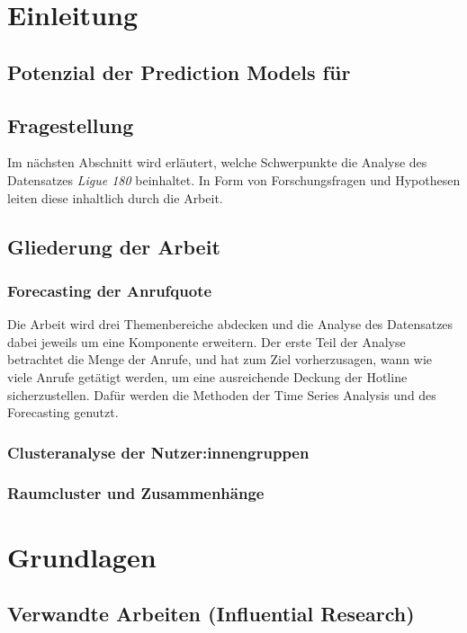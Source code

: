 \documentclass[12pt]{report}
\begin{document}
	\renewcommand{\headrulewidth}{0.1 pt}
	\renewcommand{\footrulewidth}{0 pt}
	
	\chapter{Einleitung}
	
	\section{Potenzial der Prediction Models für} %
	\section{Fragestellung}
	Im nächsten Abschnitt wird erläutert, welche Schwerpunkte die Analyse des Datensatzes \textit{Ligue 180} beinhaltet. In Form von Forschungsfragen und Hypothesen leiten diese inhaltlich durch die Arbeit. 
	\section{Gliederung der Arbeit}
	\subsection{Forecasting der Anrufquote}
	Die Arbeit wird drei Themenbereiche abdecken und die Analyse des Datensatzes dabei jeweils um eine Komponente erweitern. Der erste Teil der Analyse betrachtet die Menge der Anrufe, und hat zum Ziel vorherzusagen, wann wie viele Anrufe getätigt werden, um eine ausreichende Deckung der Hotline sicherzustellen. Dafür werden die Methoden der Time Series Analysis und des Forecasting genutzt. \\
	\subsection{Clusteranalyse der Nutzer:innengruppen}
	\subsection{Raumcluster und Zusammenhänge}
	\chapter{Grundlagen} 
	\section{Verwandte Arbeiten (Influential Research)} 
\end{document}
